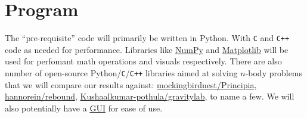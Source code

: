 \documentclass[hidelinks, 11pt, dvipsnames]{article}
\newcommand{\psubsection}[1]{
    \noindent 
    \section*{#1}
}
\begin{document}
\psubsection{Program}
The ``pre-requisite'' code will primarily be written in Python. With \texttt{C} and \texttt{C++} code as needed for performance. Libraries like \href{https://numpy.org/}{NumPy} and \href{https://matplotlib.org/}{Matplotlib} will be used for perfomant math operations and visuals respectively. There are also number of open-source Python/\texttt{C}/\texttt{C++} libraries aimed at solving $n$-body problems that we will compare our results against: \href{https://github.com/mockingbirdnest/Principia}{mockingbirdnest/Principia}, \href{https://github.com/hannorein/rebound}{hannorein/rebound}, \href{https://github.com/Kushaalkumar-pothula/gravitylab}{Kushaalkumar-pothula/gravitylab}, to name a few. We will also potentially have a \href{https://www.qt.io/qt-for-python}{GUI} for ease of use.
\end{document}
